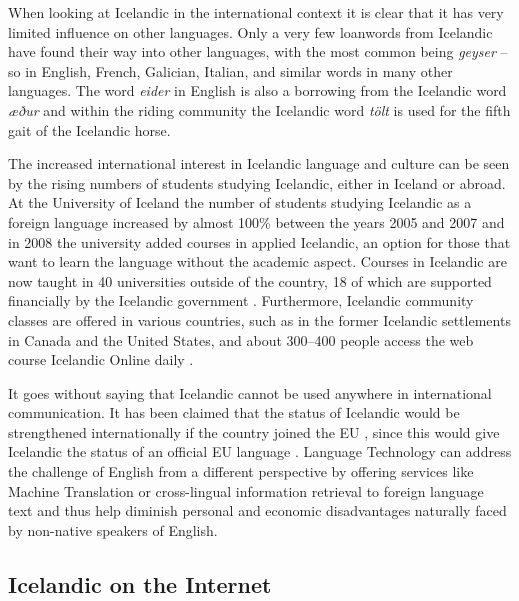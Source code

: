 \begin{multicols}{2}

When looking at Icelandic in the international context it is clear that it has very limited influence on other languages. Only a very few loanwords from Icelandic have found their way into other languages, with the most common being \textit{geyser} -- so in English, French, Galician, Italian, and similar words in many other languages. The word \textit{eider} in English is also a borrowing from the Icelandic word \textit{æður} and within the riding community the Icelandic word \textit{tölt} is used for the fifth gait of the Icelandic horse.

The increased international interest in Icelandic language and culture can be seen by the rising numbers of students studying Icelandic, either in Iceland or abroad. At the University of Iceland the number of students studying Icelandic as a foreign language increased by almost 100\% between the years 2005 and 2007 and in 2008 the university added courses in applied Icelandic, an option for those that want to learn the language without the academic aspect. Courses in Icelandic are now taught in 40 universities outside of the country, 18 of which are supported financially by the Icelandic government \cite{isl1}.  Furthermore, Icelandic community classes are offered in various countries, such as in the former Icelandic settlements in Canada and the United States, and about 300--400 people access the web course Icelandic Online daily \cite{iol1}. 


It goes without saying that Icelandic cannot be used anywhere in international communication. It has been claimed that the status of Icelandic would be strengthened internationally if the country joined the EU \cite{vis2}, since this would give Icelandic the status of an official EU language \cite{enl1}. Language Technology can address the challenge of English from a different perspective by offering services like Machine Translation or cross-lingual information retrieval to foreign language text and thus help diminish personal and economic disadvantages naturally faced by non-native speakers of English.

\subsection{Icelandic on the Internet}


\end{multicols}
